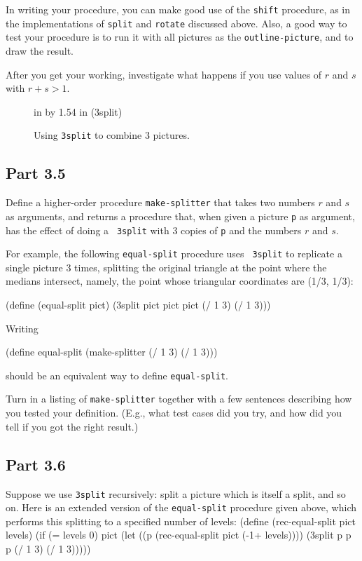 In writing your procedure, you can make good use of the {\tt shift}
procedure, as in the implementations of {\tt split} and {\tt rotate}
discussed above.  Also, a good way to test your procedure is to run it
with all pictures as the {\tt outline-picture}, and to draw the
result.

After you get your working, investigate what happens if you use values
of $r$ and $s$ with $r+s > 1$.

\begin{figure}
 in by 1.54 in (3split)
\caption{{\protect\footnotesize
Using {\tt 3split} to combine 3 pictures.}}
\label{3split}
\end{figure} 

\subsection{Part 3.5}

Define a higher-order procedure {\tt make-splitter} that takes two
numbers $r$ and $s$ as arguments, and returns a procedure that, when
given a picture {\tt p} as argument, has the effect of doing a {\tt
3split} with 3 copies of {\tt p} and the numbers $r$ and $s$.  

For example, the following {\tt equal-split} procedure uses {\tt
3split} to replicate a single picture 3 times, splitting the original
triangle at the point where the medians intersect, namely, the point
whose triangular coordinates are (1/3, 1/3):

\beginlisp
(define (equal-split pict)
  (3split pict pict pict (/ 1 3) (/ 1 3)))
\endlisp

Writing

\beginlisp
(define equal-split (make-splitter (/ 1 3) (/ 1 3)))
\endlisp

should be an equivalent way to define {\tt equal-split}.

Turn in a listing of {\tt make-splitter} together with a few sentences
describing how you tested your definition.  (E.g., what test cases
did you try, and how did you tell if you got the right result.)

\subsection{Part 3.6}

Suppose we use {\tt 3split} recursively: split a picture which is itself
a split, and so on.  Here is an extended version of the
{\tt equal-split} procedure given above, which performs this splitting
to a specified number of levels:
\beginlisp
(define (rec-equal-split pict levels)
  (if (= levels 0)
      pict
      (let ((p (rec-equal-split pict (-1+ levels))))
        (3split p p p (/ 1 3) (/ 1 3)))))
\endlisp

